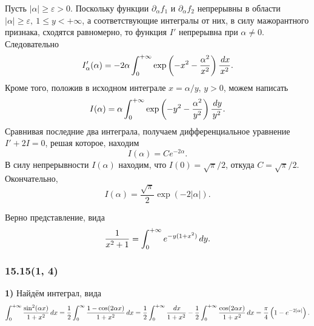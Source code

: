 Пусть $|\alpha| \geq \varepsilon > 0$. Поскольку функции $\partial_\alpha f_1$ и $\partial_\alpha f_2$ непрерывны в области $|\alpha| \geq \varepsilon, \ 1 \leq y < + \infty$, а соответствующие интегралы от них, в силу мажорантного признака, сходятся равномерно, то функция $I'$ непрерывна при $\alpha \neq 0$. Следовательно
\begin{equation*}
    I'_\alpha (\alpha) = - 2 \alpha \int_{0}^{+\infty} \exp\left(
        -x^2 - \frac{\alpha^2}{x^2}
    \right) \frac{\, d x}{x^2}.
\end{equation*}
Кроме того, положив в исходном интеграле $x = \alpha/y$, $y > 0$, можем написать
\begin{equation*}
    I(\alpha) = \alpha \int_{0}^{+\infty} \exp\left(
        -y^2 - \frac{\alpha^2}{y^2}
    \right) \frac{\, d y}{y^2}.
\end{equation*}
Сравнивая последние два интеграла, получаем дифференциальное уравнение $I' + 2 I = 0$, решая которое, находим
\begin{equation*}
    I(\alpha) = C e^{-2 \alpha}.
\end{equation*}
В силу непрерывности $I(\alpha)$ находим, что $I(0) = \sqrt{\pi}/2$, откуда $C = \sqrt{\pi}/2$. Окончательно,
\begin{equation*}
    I(\alpha) = \frac{\sqrt{\pi}}{2} \exp\left(
        - 2 |\alpha|
    \right).
\end{equation*}



\begin{to_lem}
    Верно представление, вида
    \begin{equation*}
        \frac{1}{x^2 + 1} = \int_0^{+\infty} e^{-y (1 + x^2)} \, d y.
    \end{equation*}
\end{to_lem}



\subsubsection*{15.15(1, 4)}

\noindent
\textbf{1)} Найдём интеграл, вида
\begin{equation*}
    \int_0^{+\infty} \frac{\sin^2 (\alpha x)}{1+ x^2} \, d x = \frac{1}{2} \int_0^{\infty} \frac{1-\cos(2 \alpha x)}{1 + x^2} \, d x 
    = 
    \frac{1}{2} \int_{0}^{+\infty} \frac{\, d x}{1 + x^2} - \frac{1}{2} 
    \int_{0}^{+\infty}  \frac{\cos (2 \alpha x)}{1 + x^2} \, d x = \frac{\pi}{4} \left(
        1 - e^{-2|\alpha|}
    \right).
\end{equation*}


